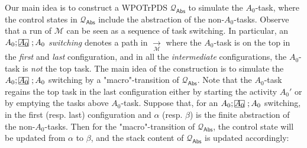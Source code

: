 \documentclass[preprint,12pt]{elsarticle}
\makeatletter
\newcommand\mathcircled[1]{%
  \mathpalette\@mathcircled{#1}%
}
\newcommand\@mathcircled[2]{%
  \tikz[baseline=(math.base)] \node[draw,circle,inner sep=0.2pt] (math) {$\m@th#1#2$};%
}
\newcommand\rectangled[1]{\tikz[baseline=(torect.base)]{
    \node[shape = rectangle, draw, inner sep=0pt, outer sep = 0pt] (torect) {#1}
    }
}
\newcommand{\mrectangled}[1]{\text{\rectangled{\ensuremath{#1}}}}
\newcommand{\mhcancel}[1]{\mrectangled{#1}}
\newcommand\Mm{{\mathcal{M} }}
\newcommand\Pp{{\mathcal{P} }}
\newcommand\Qq{{\mathcal{Q} }}
\newcommand\lmd{{\sf Lmd}}
\newcommand{\AMASS}{\textsf{ASM}}
\newcommand{\LMAMASS}{\textsf{ASM}_\textsf{LM}}
\newcommand\abs{{\mathsf{Abs} }}
\newcommand\AutReach{\mathscr{R}}
\newcommand{\STK}{\mathsf{STK}}
\newcommand\Aut{{\mathfrak{A} }}
\newcommand{\PDS}{\textsf{PDS}}
\newcommand{\WOTrPDS}{\textsf{WPOTrPDS}}
\newcommand{\WOTrNFA}{\textsf{WPOTrNFA}}
\newcommand{\NFA}{\textsf{NFA}}
\newcommand\topact{\mathsf{Top}}
\makeatother
\begin{document}
{%

Our main idea is to construct a {\WOTrPDS} $\Qq_{\abs}$ to simulate the $A_0$-task, where the control states in $\Qq_{\abs}$ include the abstraction of the non-$A_0$-tasks.
Observe that a run of $\Mm$ can be seen as a sequence of task switching. In particular, an $A_0;\mhcancel{A_0};A_0$ \emph{switching} denotes a path in $\xrightarrow[\Mm]{}$ where the $A_0$-task is on the top in the \emph{first} and \emph{last} configuration, and in all the \emph{intermediate} configurations, the $A_0$-task is \emph{not} the top task. The main idea of the construction is to simulate the $A_0;\mhcancel{A_0};A_0$ switching by a "macro"-transition of $\Qq_{\abs}$. Note that the $A_0$-task regains the top task in the last configuration either by starting the activity $A_0'$ or by emptying the tasks above $A_0$-task. Suppose that, for an $A_0;\mhcancel{A_0};A_0$ switching, in the first (resp. last) configuration and $\alpha$ (resp. $\beta$) is the finite abstraction of the non-$A_0$-tasks. Then for the "macro"-transition of $\Qq_{\abs}$, the control state will be updated from $\alpha$ to $\beta$, and the stack content of $\Qq_{\abs}$ is updated accordingly:

}
\end{document}
